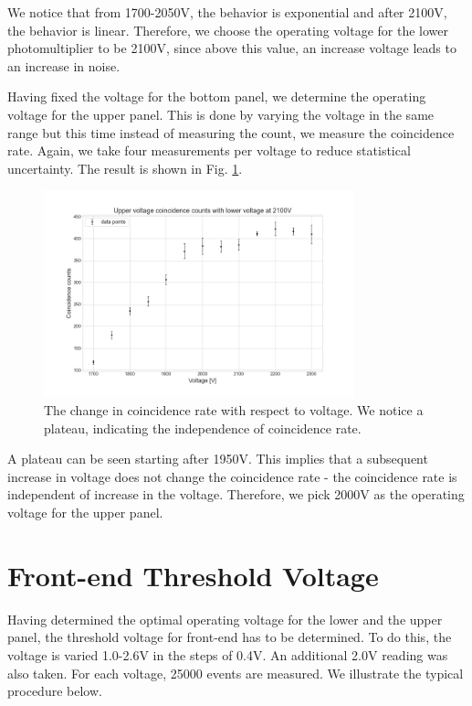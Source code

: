 \documentclass[a4paper]{report}
\numberwithin{equation}{section}
\begin{document}
We notice that from 1700-2050V, the behavior is exponential and after 2100V, the behavior is linear. Therefore, we choose the operating voltage for the lower photomultiplier to be 2100V, since above this value, an increase voltage leads to an increase in noise. 

Having fixed the voltage for the bottom panel, we determine the operating voltage for the upper panel. This is done by varying the voltage in the same range but this time instead of measuring the count, we measure the coincidence rate. Again, we take four measurements per voltage to reduce statistical uncertainty. The result is shown in Fig. \ref{fig:up_count}. 

\begin{figure}[htpb]
    \centering
    \includegraphics[width=0.8\textwidth]{up_count}
    \caption{The change in coincidence rate with respect to voltage. We notice a plateau, indicating the independence of coincidence rate.}
    \label{fig:up_count}
\end{figure}

A plateau can be seen starting after 1950V. This implies that a subsequent increase in voltage does not change the coincidence rate - the coincidence rate is independent of increase in the voltage. Therefore, we pick 2000V as the operating voltage for the upper panel. 

\section{Front-end Threshold Voltage}

Having determined the optimal operating voltage for the lower and the upper panel, the threshold voltage for front-end has to be determined. To do this, the voltage is varied 1.0-2.6V in the steps of 0.4V. An additional 2.0V reading was also taken. For each voltage, 25000 events are measured. We illustrate the typical procedure below. 
\end{document}
